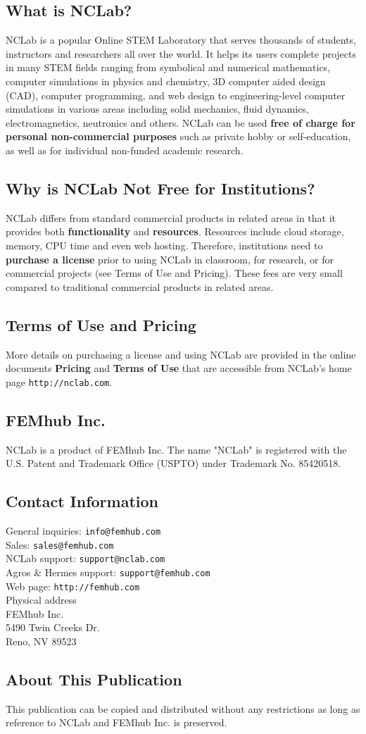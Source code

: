 \subsection*{What is NCLab?}
NCLab is a popular Online STEM Laboratory that serves thousands of students, instructors and 
researchers all over the world. It helps its users complete projects in many STEM fields ranging from
symbolical and numerical mathematics, computer simulations in physics and chemistry, 3D computer 
aided design (CAD), computer programming, and web design to engineering-level computer simulations 
in various areas including solid mechanics, fluid dynamics, electromagnetics, neutronics and others. 
NCLab can be used {\bf free of charge for personal non-commercial purposes} such as private 
hobby or self-education, as well as for individual non-funded academic research.

\noindent
\subsection*{Why is NCLab Not Free for Institutions?}
NCLab differs from standard commercial products in related areas in that it provides both 
{\bf functionality} and {\bf resources}. Resources include cloud storage, memory, 
CPU time and even web hosting. Therefore, institutions need to {\bf purchase a license} 
prior to using NCLab in classroom, for research, or for commercial projects (see Terms of Use and 
Pricing). These fees are very small compared to traditional commercial products in related areas. 

\subsection*{Terms of Use and Pricing}
More details on purchasing a license and using NCLab are provided in the online documents 
{\bf Pricing} and {\bf Terms of Use} that are accessible from NCLab's home page 
{\tt http://nclab.com}.

\subsection*{FEMhub Inc.}

NCLab is a product of FEMhub Inc. The name "NCLab" is 
registered with the U.S. Patent and Trademark Office (USPTO) under Trademark No. 85420518.

\subsection*{Contact Information}
General inquiries: {\tt info@femhub.com}\\
Sales: {\tt sales@femhub.com}\\
NCLab support: {\tt support@nclab.com}\\
Agros \& Hermes support: {\tt support@femhub.com}\\
Web page: {\tt http://femhub.com}\\
{Physical address}\\
FEMhub Inc.\\
5490 Twin Creeks Dr.\\
Reno, NV 89523

\subsection*{About This Publication}
This publication can be copied and distributed without any restrictions
as long as reference to NCLab and FEMhub Inc. is preserved.
